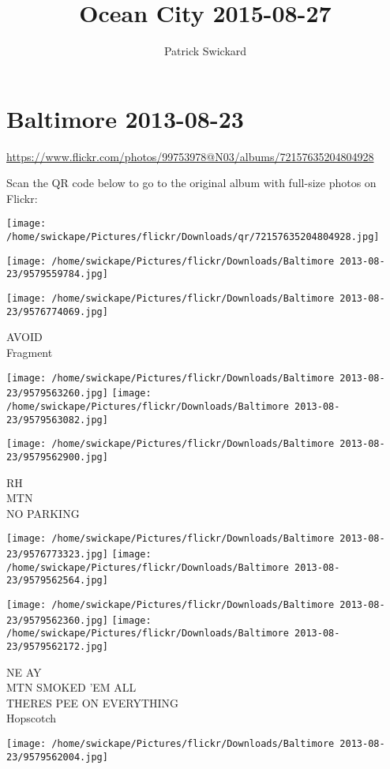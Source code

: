 \documentclass[10pt,letterpaper]{article}
\title{Ocean City 2015-08-27}
\author{Patrick Swickard}
\date{}
\begin{document}
\section*{Baltimore 2013-08-23}

\url{https://www.flickr.com/photos/99753978@N03/albums/72157635204804928}

Scan the QR code below to go to the original album with full-size photos on Flickr:

\texttt{[image: /home/swickape/Pictures/flickr/Downloads/qr/72157635204804928.jpg]}
\pagebreak

\texttt{[image: /home/swickape/Pictures/flickr/Downloads/Baltimore 2013-08-23/9579559784.jpg]}

\vspace{0.25in}
\texttt{[image: /home/swickape/Pictures/flickr/Downloads/Baltimore 2013-08-23/9576774069.jpg]}

AVOID\\
Fragment
\pagebreak

\texttt{[image: /home/swickape/Pictures/flickr/Downloads/Baltimore 2013-08-23/9579563260.jpg]}
\texttt{[image: /home/swickape/Pictures/flickr/Downloads/Baltimore 2013-08-23/9579563082.jpg]}

\vspace{0.25in}
\texttt{[image: /home/swickape/Pictures/flickr/Downloads/Baltimore 2013-08-23/9579562900.jpg]}

RH\\
MTN\\
NO PARKING
\pagebreak

\texttt{[image: /home/swickape/Pictures/flickr/Downloads/Baltimore 2013-08-23/9576773323.jpg]}
\texttt{[image: /home/swickape/Pictures/flickr/Downloads/Baltimore 2013-08-23/9579562564.jpg]}

\texttt{[image: /home/swickape/Pictures/flickr/Downloads/Baltimore 2013-08-23/9579562360.jpg]}
\texttt{[image: /home/swickape/Pictures/flickr/Downloads/Baltimore 2013-08-23/9579562172.jpg]}

NE AY\\
MTN SMOKED 'EM ALL\\
THERES PEE ON EVERYTHING\\
Hopscotch
\pagebreak

\texttt{[image: /home/swickape/Pictures/flickr/Downloads/Baltimore 2013-08-23/9579562004.jpg]}
\end{document}
